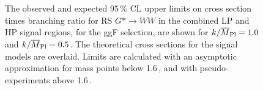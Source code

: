 \clearpage
\begin{figure}[H]
\centering
{}\\
\\
\caption[Observed and expected upper limits for RS $G^*$ model (gluon-gluon fusion selection)]{The observed and expected 95\,\% CL upper limits on cross section times branching ratio for RS $G* \rightarrow WW$ in the combined LP and HP signal regions, for the ggF selection, are shown for \protect{} $k/\overline{M}_{\rm Pl}=1.0$ and  \protect{} $k/\overline{M}_{\rm Pl}=0.5$. The theoretical cross sections for the signal models are overlaid. Limits are calculated with an asymptotic approximation for mass points below 1.6\,\TeV, and with pseudo-experiments above 1.6\,\TeV.}
\label{fig:lim_RSGWW}
\end{figure}
